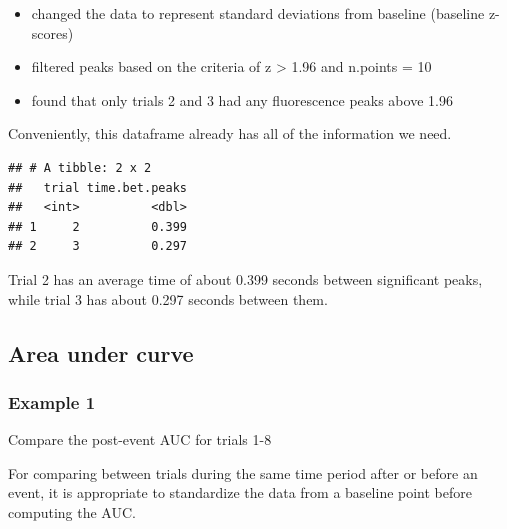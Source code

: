 \documentclass[
]{book}
\newenvironment{Shaded}{\begin{snugshade}}{\end{snugshade}}
\newcommand{\DataTypeTok}[1]{\textcolor[rgb]{0.13,0.29,0.53}{#1}}
\newcommand{\KeywordTok}[1]{\textcolor[rgb]{0.13,0.29,0.53}{\textbf{#1}}}
\newcommand{\NormalTok}[1]{#1}
\newcommand{\OperatorTok}[1]{\textcolor[rgb]{0.81,0.36,0.00}{\textbf{#1}}}
\newcommand{\StringTok}[1]{\textcolor[rgb]{0.31,0.60,0.02}{#1}}
\providecommand{\tightlist}{%
  \setlength{\itemsep}{0pt}\setlength{\parskip}{0pt}}
\begin{document}
\begin{itemize}
\tightlist
\item
  changed the data to represent standard deviations from baseline (baseline z-scores)
\item
  filtered peaks based on the criteria of z \textgreater{} 1.96 and n.points = 10
\item
  found that only trials 2 and 3 had any fluorescence peaks above 1.96
\end{itemize}

Conveniently, this dataframe already has all of the information we need.

\begin{Shaded}
\end{Shaded}

\begin{verbatim}
## # A tibble: 2 x 2
##   trial time.bet.peaks
##   <int>          <dbl>
## 1     2          0.399
## 2     3          0.297
\end{verbatim}

Trial 2 has an average time of about 0.399 seconds between significant peaks, while trial 3 has about 0.297 seconds between them.

\hypertarget{analysis-app-auc}{%
\subsection{Area under curve}\label{analysis-app-auc}}

\hypertarget{analysis-app-auc-ex1}{%
\subsubsection{Example 1}\label{analysis-app-auc-ex1}}

Compare the post-event AUC for trials 1-8

For comparing between trials during the same time period after or before an event, it is appropriate to standardize the data from a baseline point before computing the AUC.
\end{document}
